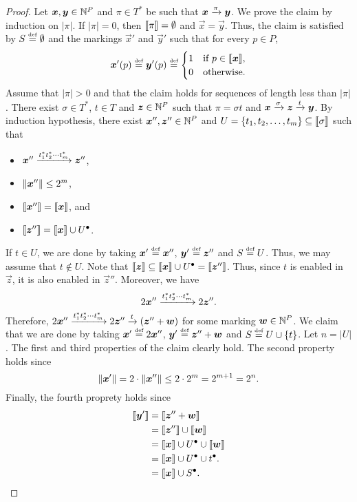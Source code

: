 \begin{proof}
  Let $\bm{x}, \bm{y} \in \mathbb{N}^P$ and $\pi \in T^*$ be such that
  $\bm{x} \xrightarrow{\pi} \bm{y}$. We prove the claim by induction on
  $|\pi|$. If $|\pi| = 0$, then $\llbracket\pi\rrbracket = \emptyset$ and $\vec{x}
  = \vec{y}$. Thus, the claim is satisfied by $S \stackrel{\scriptscriptstyle\text{def}}{=} \emptyset$ and
  the markings $\vec{x}'$ and $\vec{y}'$ such that for every $p \in P$,
  $$
  \bm{x}'(p) \stackrel{\scriptscriptstyle\text{def}}{=} \bm{y}'(p) \stackrel{\scriptscriptstyle\text{def}}{=}
  \begin{cases}
    1 & \text{if } p \in \llbracket\bm{x}\rrbracket, \\
    0 & \text{otherwise}.
  \end{cases}
  $$ Assume that $|\pi| > 0$ and that the claim holds for sequences of
  length less than $|\pi|$. There exist $\sigma \in T^*$, $t \in T$
  and $\bm{z} \in \mathbb{N}^P$ such that $\pi = \sigma t$ and $\bm{x}
  \xrightarrow{\sigma} \bm{z} \xrightarrow{t} \bm{y}$. By induction hypothesis,
  there exist $\bm{x}'', \bm{z}'' \in \mathbb{N}^P$ and $U = \{t_1, t_2,
  \ldots, t_m\} \subseteq \llbracket\sigma\rrbracket$ such that
  \begin{itemize}
  \item $\bm{x}'' \xrightarrow{t_1^* t_2^* \cdots t_m^*} \bm{z}''$,

  \item $\lVert\bm{x}''\rVert \leq 2^m$,

  \item $\llbracket\bm{x}''\rrbracket = \llbracket\bm{x}\rrbracket$, and 

  \item $\llbracket\bm{z}''\rrbracket = \llbracket\bm{x}\rrbracket \cup {U^\bullet}$.
  \end{itemize}
  
  If $t \in U$, we are done by taking $\bm{x}' \stackrel{\scriptscriptstyle\text{def}}{=} \bm{x}''$,
  $\bm{y}' \stackrel{\scriptscriptstyle\text{def}}{=} \bm{z}''$ and $S \stackrel{\scriptscriptstyle\text{def}}{=} U$. Thus, we may assume
  that $t \not\in U$. Note that $\llbracket\bm{z}\rrbracket \subseteq
  \llbracket\bm{x}\rrbracket \cup {U^\bullet} = \llbracket\bm{z}''\rrbracket$. Thus, since $t$ is
  enabled in $\vec{z}$, it is also enabled in $\vec{z}''$. Moreover,
  we have $$2 \bm{x}'' \xrightarrow{t_1^* t_2^* \cdots t_m^*} 2
  \bm{z}''.$$ Therefore, $2 \bm{x}'' \xrightarrow{t_1^* t_2^* \cdots
    t_m^*} 2 \bm{z}'' \xrightarrow{t} (\bm{z}'' + \bm{w})$ for some
  marking $\bm{w} \in \mathbb{N}^P$.  We claim that we are done by taking
  $\bm{x}' \stackrel{\scriptscriptstyle\text{def}}{=} 2 \bm{x}''$, $\bm{y}' \stackrel{\scriptscriptstyle\text{def}}{=} \bm{z}'' + \bm{w}$
  and $S \stackrel{\scriptscriptstyle\text{def}}{=} U \cup \{t\}$. Let $n = |U|$. The first and third
  properties of the claim clearly hold. The second property holds
  since $$\lVert\bm{x}'\rVert = 2 \cdot \lVert\bm{x}''\rVert \leq 2 \cdot 2^m
  = 2^{m+1} = 2^n.$$ Finally, the fourth proprety holds since
  \begin{align*}
    \llbracket\bm{y}'\rrbracket
    &= \llbracket\bm{z}'' + \bm{w}\rrbracket \\
    &= \llbracket\bm{z}''\rrbracket \cup \llbracket\bm{w}\rrbracket \\
    &= \llbracket\bm{x}\rrbracket \cup {U^\bullet} \cup \llbracket\bm{w}\rrbracket \\ 
    &= \llbracket\bm{x}\rrbracket \cup {U^\bullet} \cup {t^\bullet}. \\ 
    &= \llbracket\bm{x}\rrbracket \cup {S^\bullet}.\qedhere
  \end{align*}
\end{proof}

